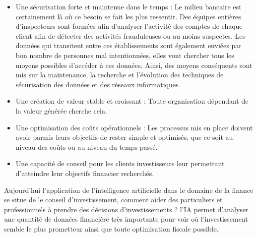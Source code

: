         \begin{itemize}

            \item Une sécurisation forte et maintenue dans le temps : \newline
            Le milieu bancaire est certainement là où ce besoin se fait les plus ressentir.
            Des équipes entières d'inspecteurs sont formées afin d'analyser
            l'activité des comptes de chaque client
            afin de détecter des activités frauduleuses ou au moins suspectes. \newline
            Les données qui transitent entre ces établissements sont également
            enviées par bon nombre de personnes mal intentionnées,
            elles vont chercher tous les moyens possibles d'accéder à ces données. Ainsi,
            des moyens conséquents sont mis sur la maintenance, la recherche et l'évolution
            des techniques de sécurisation des données et des réseaux informatiques. \newline

            \item Une création de valeur stable et croissant : \newline
            Toute organisation dépendant de la valeur générée cherche cela. \newline

            \item Une optimisation des coûts opérationnels : \newline
            Les processus mis en place doivent avoir parmis leurs objectifs de
            rester simple et optimisés, que ce soit au niveau des coûts
            ou au niveau du temps passé. \newline

            \item Une capacité de conseil pour les clients investisseurs leur permettant 
            d'atteindre leur objectifs financier recherchés. \newline
        \end{itemize}

        Aujourd'hui l'application de l'intelligence artificielle dans le domaine de la finance 
        se situe de le conseil d'investissement, comment aider des particuliers et professionnels 
        à prendre des décisions d'investissements ? l'IA permet d'analyser une quantité 
        de données financière très importante pour voir où l'investissement semble le plus prometteur 
        ainsi que toute optimisation fiscale possible. \newline 

